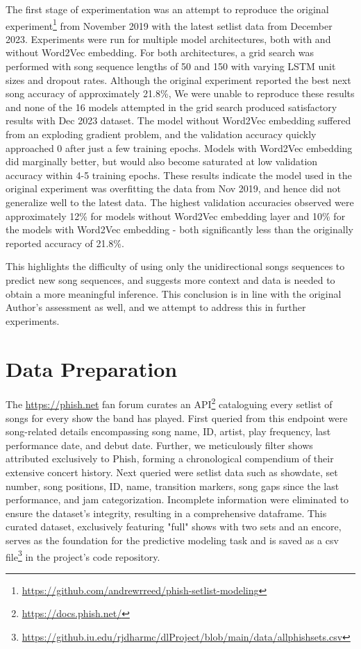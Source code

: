 \documentclass{article}
\begin{document}
The first stage of experimentation was an attempt to reproduce the original experiment\footnote{\url{https://github.com/andrewrreed/phish-setlist-modeling}} from November 2019 with the latest setlist data from December 2023. Experiments were run for multiple model architectures, both with and without Word2Vec embedding. For both architectures, a grid search was performed with song sequence lengths of 50 and 150 with varying LSTM unit sizes and dropout rates. Although the original experiment reported the best next song accuracy of approximately 21.8\%, We were unable to reproduce these results and none of the 16 models attempted in the grid search produced satisfactory results with Dec 2023 dataset. The model without Word2Vec embedding suffered from an exploding gradient problem, and the validation accuracy quickly approached 0 after just a few training epochs. Models with Word2Vec embedding did marginally better, but would also become saturated at low validation accuracy within 4-5 training epochs. These results indicate the model used in the original experiment was overfitting the data from Nov 2019, and hence did not generalize well to the latest data. The highest validation accuracies observed were approximately 12\% for models without Word2Vec embedding layer and 10\% for the models with Word2Vec embedding - both significantly less than the originally reported accuracy of 21.8\%. 

This highlights the difficulty of using only the unidirectional songs sequences to predict new song sequences, and  suggests more context and data is needed to obtain a more meaningful inference. This conclusion is in line with the original Author's assessment as well, and we attempt to address this in further experiments. 

\section{Data Preparation}

The \url{https://phish.net} fan forum curates an API\footnote{\url{https://docs.phish.net/}} cataloguing every setlist of songs for every show the band has played. First queried from this endpoint were song-related details encompassing song name, ID, artist, play frequency, last performance date, and debut date. Further, we meticulously filter shows attributed exclusively to Phish, forming a chronological compendium of their extensive concert history. Next queried were setlist data such as showdate, set number, song positions, ID, name, transition markers, song gaps since the last performance, and jam categorization. Incomplete information were eliminated to ensure the dataset's integrity, resulting in a comprehensive dataframe. This curated dataset, exclusively featuring "full" shows with two sets and an encore, serves as the foundation for the predictive modeling task and is saved as a csv file\footnote{\url{https://github.iu.edu/rjdharmc/dlProject/blob/main/data/allphishsets.csv}} in the project's code repository.
\end{document}
